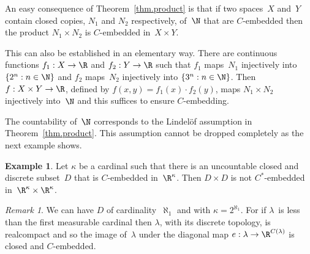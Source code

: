 \documentclass[a4paper]{amsart}
\theoremstyle{plain}
\theoremstyle{definition}
\newtheorem{example}[theorem]{Example}
\theoremstyle{remark}
\newtheorem{remark}[theorem]{Remark}
\begin{document}
An easy consequence of Theorem~\ref{thm.product} is that if two spaces~$X$
and~$Y$ contain closed copies, $N_1$ and $N_2$ respectively, of~$\N$ that
are $C$-embedded then the product $N_1\times N_2$ is $C$-embedded 
in~$X\times Y$. 

This can also be established in an elementary way.
There are continuous functions $f_1:X\to\R$ and $f_2:Y\to\R$ such that
$f_1$ maps~$N_1$ injectively into $\{2^n:n\in\N\}$ and
$f_2$ maps~$N_2$ injectively into $\{3^n:n\in\N\}$.
Then $f:X\times Y\to\R$, defined by $f(x,y)=f_1(x)\cdot f_2(y)$,
maps $N_1\times N_2$ injectively into~$\N$ and this suffices to ensure 
$C$-embedding.  

The countability of~$\N$ corresponds to the Lindel\"of assumption
in Theorem~\ref{thm.product}.
This assumption cannot be dropped completely as the next example shows.

\begin{example}\label{example.discrete}
Let $\kappa$ be a cardinal such that there is an uncountable closed and 
discrete subset~$D$ that is $C$-embedded in~$\R^\kappa$.
Then $D\times D$ is not $C^*$-embedded in~$\R^\kappa\times\R^\kappa$.
\end{example}

\begin{remark}
We can have $D$ of cardinality~$\aleph_1$ and with $\kappa=2^{\aleph_1}$.
For if $\lambda$~is less than the first measurable cardinal then $\lambda$,
with its discrete topology, is realcompact and so the image of~$\lambda$
under the diagonal map $e:\lambda\to\R^{C(\lambda)}$ is closed and $C$-embedded.
\end{remark}
\end{document}
